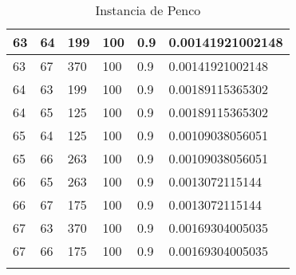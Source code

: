 \begin{longtable}{|l|l|l|l|l|l|}
63 & 64 & 199 & 100 & 0.9 & 0.00141921002148 \\ \hline
63 & 67 & 370 & 100 & 0.9 & 0.00141921002148 \\ \hline
64 & 63 & 199 & 100 & 0.9 & 0.00189115365302 \\ \hline
64 & 65 & 125 & 100 & 0.9 & 0.00189115365302 \\ \hline
65 & 64 & 125 & 100 & 0.9 & 0.00109038056051 \\ \hline
65 & 66 & 263 & 100 & 0.9 & 0.00109038056051 \\ \hline
66 & 65 & 263 & 100 & 0.9 & 0.0013072115144  \\ \hline
66 & 67 & 175 & 100 & 0.9 & 0.0013072115144  \\ \hline
67 & 63 & 370 & 100 & 0.9 & 0.00169304005035 \\ \hline
67 & 66 & 175 & 100 & 0.9 & 0.00169304005035 \\ \hline
\caption{Instancia de Penco}
\label{tab:penco}

\end{longtable}

